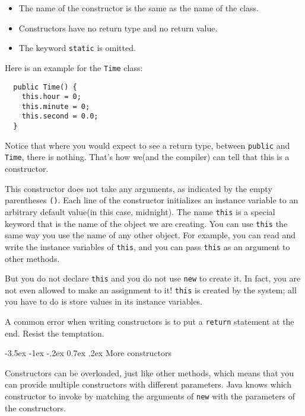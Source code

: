 \documentclass{book}
\makeatletter
\renewcommand{\section}{\@startsection 
    {section} {1} {0mm}%
    {-3.5ex \@plus -1ex \@minus -.2ex}%
    {0.7ex \@plus.2ex}%
    {\normalfont\Large\bfseries}}
\makeatother
\begin{document}
\begin{itemize}

\item The name of the constructor is the same as the name of
the class.

\item Constructors have no return type and no return value.

\item The keyword {\tt static} is omitted.

\end{itemize}

Here is an example for the {\tt Time} class:

\begin{verbatim}
  public Time() {
    this.hour = 0;
    this.minute = 0;
    this.second = 0.0;
  }
\end{verbatim}
%
Notice that where you would expect to see a return type,
between {\tt public} and {\tt Time}, there is nothing.  That's
how we(and the compiler) can tell that this is a constructor.

This constructor does not take any arguments, as indicated by the
empty parentheses {\tt()}.  Each line of the constructor initializes
an instance variable to an arbitrary default value(in this case,
midnight).  The name {\tt this} is a special
keyword that is the name of the object we are creating.  You can use
{\tt this} the same way you use the name of any other object.  For
example, you can read and write the instance variables of {\tt this},
and you can pass {\tt this} as an argument to other methods.


But you do not declare {\tt this} and you do not use {\tt new}
to create it.  In fact, you are not even allowed to make an
assignment to it!  {\tt this} is created by the system; all you
have to do is store values in its instance variables.

A common error when writing constructors is to put a {\tt return}
statement at the end.  Resist the temptation.

\section{More constructors}

Constructors can be overloaded, just like other methods,
which means that you can provide multiple constructors
with different parameters.  Java knows which constructor
to invoke by matching the arguments of {\tt new}
with the parameters of the constructors.
\end{document}
